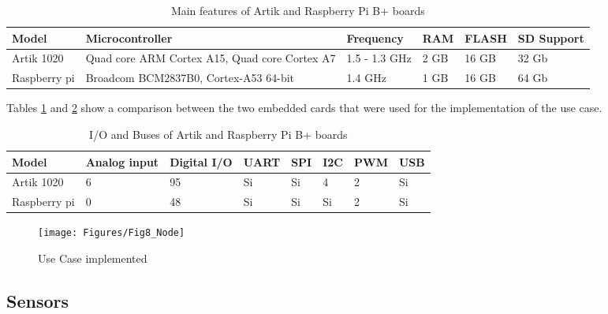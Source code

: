 \begin{table}[]
\begin{tabular}{|l|p{3.4cm}|l|p{1.2cm}|p{1.2cm}|p{2.0cm}|}
\hline \hline
\textbf{Model} & \textbf{Microcontroller} 										 & \textbf{Frequency} & \textbf{RAM} & \textbf{FLASH} & \textbf{SD Support} \\ \hline \hline
 Artik 1020    & Quad core ARM Cortex A15, Quad core Cortex A7 & 1.5 - 1.3 GHz      &  2 GB				 & 16 GB					& 32 Gb 									 \\ \hline
 Raspberry pi  & Broadcom BCM2837B0, Cortex-A53 64-bit         & 1.4 GHz						&  1 GB				 & 16 GB 					& 64 Gb 									 \\ \hline \hline
\end{tabular}
\caption{Main features of Artik and Raspberry Pi B+ boards}
\label{ch5_tab:1}       %
\end{table}

Tables \ref{ch5_tab:1} and \ref{ch5_tab:2} show a comparison between the two embedded cards that were used for the implementation of the use case.

\begin{table}[]
\begin{tabular}{|l|l|l|p{1.2cm}|p{1.2cm}|p{1.2cm}|p{1.2cm}|p{1.2cm}|}
\hline \hline
\textbf{Model} & \textbf{Analog input} & \textbf{Digital I/O} & \textbf{UART} & \textbf{SPI} & \textbf{I2C} & \textbf{PWM} & \textbf{USB} \\ \hline \hline
Artik 1020     & 6 										 & 95 							 		& Si  					& Si  				 &	4						& 2						 & Si  					\\ \hline
Raspberry pi   & 0 							       & 48	  						 		& Si 						& Si 					 &	Si					&	2						 & Si					  \\ \hline \hline
\end{tabular}
\caption{I/O and Buses of Artik and Raspberry Pi B+ boards}
\label{ch5_tab:2}       %
\end{table}

\begin{figure}[ht!]
\centering
\texttt{[image: Figures/Fig8\_Node]}
\caption{Use Case implemented}
\label{ch5_fig:8}       %
\end{figure}

\subsection{Sensors}

